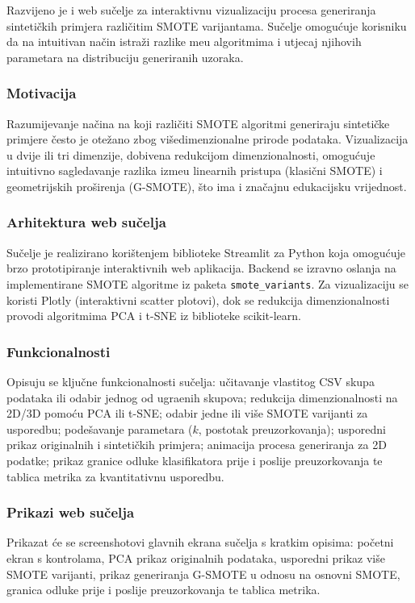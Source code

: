
Razvijeno je i web su\v{c}elje za interaktivnu
vizualizaciju procesa generiranja sinteti\v{c}kih primjera razli\v{c}itim
SMOTE varijantama. Su\v{c}elje omogu\'{c}uje korisniku da na intuitivan
na\v{c}in istra\v{z}i razlike me\dj{}u algoritmima i utjecaj njihovih
parametara na distribuciju generiranih uzoraka.

\subsubsection{Motivacija}

Razumijevanje na\v{c}ina na koji razli\v{c}iti SMOTE algoritmi generiraju
sinteti\v{c}ke primjere \v{c}esto je ote\v{z}ano zbog vi\v{s}edimenzionalne
prirode podataka. Vizualizacija u dvije ili tri dimenzije, dobivena
redukcijom dimenzionalnosti, omogu\'{c}uje intuitivno sagledavanje
razlika izme\dj{}u linearnih pristupa (klasi\v{c}ni SMOTE) i
geometrijskih pro\v{s}irenja (G-SMOTE), \v{s}to ima i zna\v{c}ajnu
edukacijsku vrijednost.

\subsubsection{Arhitektura web su\v{c}elja}

Su\v{c}elje je realizirano kori\v{s}tenjem biblioteke Streamlit za
Python koja omogu\'{c}uje brzo prototipiranje interaktivnih web
aplikacija. Backend se izravno oslanja na implementirane SMOTE algoritme
iz paketa \texttt{smote\_variants}. Za vizualizaciju se koristi Plotly
(interaktivni scatter plotovi), dok se redukcija dimenzionalnosti provodi
algoritmima PCA i t-SNE iz biblioteke scikit-learn.

\subsubsection{Funkcionalnosti}

Opisuju se klju\v{c}ne funkcionalnosti su\v{c}elja:
u\v{c}itavanje vlastitog CSV skupa podataka ili odabir jednog od
ugra\dj{}enih skupova; redukcija dimenzionalnosti na 2D/3D pomo\'{c}u
PCA ili t-SNE; odabir jedne ili vi\v{s}e SMOTE varijanti za usporedbu;
pode\v{s}avanje parametara ($k$, postotak preuzorkovanja); usporedni
prikaz originalnih i sinteti\v{c}kih primjera; animacija procesa
generiranja za 2D podatke; prikaz granice odluke klasifikatora prije i
poslije preuzorkovanja te tablica metrika za kvantitativnu usporedbu.

\subsubsection{Prikazi web su\v{c}elja}

Prikazat \'{c}e se screenshotovi glavnih ekrana su\v{c}elja s kratkim
opisima: po\v{c}etni ekran s kontrolama, PCA prikaz originalnih podataka,
usporedni prikaz vi\v{s}e SMOTE varijanti, prikaz generiranja G-SMOTE u
odnosu na osnovni SMOTE, granica odluke prije i poslije preuzorkovanja
te tablica metrika.
